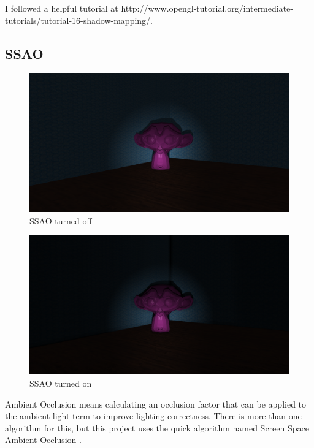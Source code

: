 \documentclass{book}
\begin{document}
      I followed a helpful tutorial at http://www.opengl-tutorial.org/intermediate-tutorials/tutorial-16-shadow-mapping/.

    \subsection{SSAO} \label{ssao}
      \begin{figure}[h!]
        \centering
        \includegraphics[width=1.0\textwidth]{nossao}
        \caption{SSAO turned off}
      \end{figure}

      \begin{figure}[h!]
        \centering
        \includegraphics[width=1.0\textwidth]{ssao}
        \caption{SSAO turned on}
      \end{figure}

      Ambient Occlusion means calculating an occlusion factor that can be applied to the ambient light term to improve lighting correctness. There is more than one algorithm for this, but this project uses the quick algorithm named Screen Space Ambient Occlusion \cite{kajalinshaderx7}\cite{mittring2007finding}.
\end{document}
